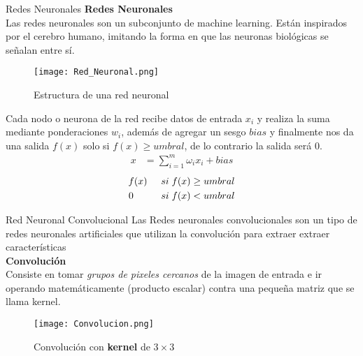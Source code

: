 \begin{frame}{Redes Neuronales}
    \textbf{Redes Neuronales}\\
    Las redes neuronales son un subconjunto de machine learning. Están inspirados por el cerebro humano, imitando la forma en que
    las neuronas biológicas se señalan entre sí.
    \begin{figure}[H]
        \centering
        \texttt{[image: Red\_Neuronal.png]}
        \caption{Estructura de una red neuronal}
        \label{fig:SRCNN_RedNeuronal}
    \end{figure}
\end{frame}

\begin{frame}{}
    Cada nodo o neurona de la red recibe datos de entrada $x_i$ y realiza la suma mediante ponderaciones $w_i$, además de agregar
    un sesgo $bias$ y finalmente nos da una salida $f(x)$ solo si $f(x)\geq umbral$, de lo contrario la salida será $0$.
    \begin{align}
        \label{eqn:SRCNN_RedNeuronal}
                     x&=\sum_{i=1}^{m}\omega_ix_i+bias
    \end{align}
    \begin{equation}
        \begin{split}
            f(x)\hspace{0.5cm}si\hspace{0.1cm}f(x)\geq umbral \\
            0\hspace{1.0cm}si\hspace{0.1cm}f(x) < umbral
        \end{split}
    \end{equation}
\end{frame}

\begin{frame}{Red Neuronal Convolucional}
    Las Redes neuronales convolucionales son un tipo de redes neuronales artificiales que utilizan la
    convolución para extraer extraer características\\
    \textbf{Convolución}\\
    Consiste en tomar \emph{grupos de pixeles cercanos} de la imagen de entrada e ir operando
    matemáticamente (producto escalar) contra una pequeña matriz que se llama kernel.
    \begin{figure}[H]
        \label{fig:SRCNN_Convolucion}
        \centering
        \texttt{[image: Convolucion.png]}
        \caption{Convolución con \textbf{kernel} de $3\times 3$}
    \end{figure}
\end{frame}

